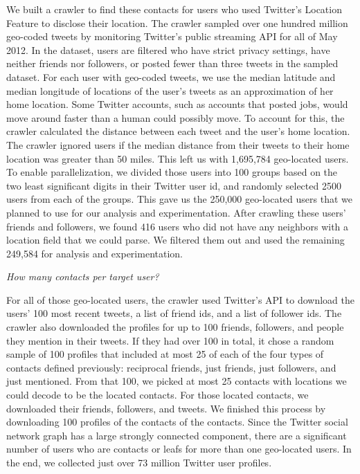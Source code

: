 We built a crawler to find these contacts for users who used Twitter's Location
Feature to disclose their location.
The crawler sampled over one hundred million geo-coded tweets by monitoring
Twitter's public streaming API for all of May 2012.
In the dataset, users are filtered who have strict privacy settings, have
neither friends nor followers, or posted fewer than three tweets in the sampled
dataset.
For each user with geo-coded tweets, we use the median latitude and median
longitude of locations of the user's tweets as an approximation of her home
location.
Some Twitter accounts, such as accounts that posted jobs, would
move around faster than a human could possibly move.
To account for this, the crawler calculated the distance between each tweet and
the user's home location.
The crawler ignored users if the median distance from their tweets to their
home location was greater than 50 miles.
This left us with 1,695,784 geo-located users.
To enable parallelization, we divided those users into 100 groups based on
the two least significant digits in their Twitter user id, and randomly selected
2500 users from each of the groups.
%
This gave us the 250,000 geo-located users that we planned to use for our
analysis and experimentation.
%
After crawling these users' friends and followers, we found 416 users who did
not have any neighbors with a location field that we could parse.
%
We filtered them out and used the remaining 249,584 for analysis and
experimentation.


\emph{How many contacts per target user?}

For all of those geo-located users, the crawler used Twitter's API to download
the users' 100 most recent tweets, a list of friend ids, and a list of follower ids.
The crawler also downloaded the profiles for up to 100 friends, followers, and
people they mention in their tweets.
%
If they had over 100 in total, it chose a random sample of 100 profiles that
included at most 25 of each of the four types of contacts defined previously:
reciprocal friends, just friends, just followers, and just mentioned.
%
From that 100, we picked at most 25 contacts with locations we could decode to
be the located contacts. For those located contacts, we downloaded their
friends, followers, and tweets.
%
We finished this process by downloading 100 profiles of the contacts of the
contacts.
%
Since the Twitter social network graph has a large strongly connected
component, there are a significant number of users who are contacts or leafs for
more than one geo-located users.
%
In the end, we collected just over 73 million Twitter user profiles.

